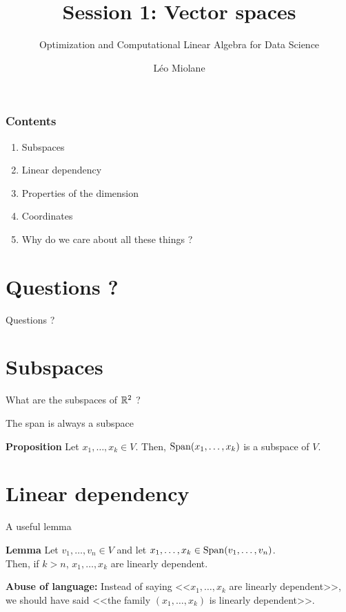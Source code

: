 \documentclass{beamer}
\title{Session 1: Vector spaces}
\subtitle{Optimization and Computational Linear Algebra for Data Science}
\author{Léo Miolane}
\date{}
\begin{document}
\setcounter{showProgressBar}{0}
\setcounter{showSlideNumbers}{0}

\frame{\titlepage}

\begin{frame}
	\frametitle{Contents}
	\begin{enumerate}
		\item Subspaces
		\item Linear dependency
		\item Properties of the dimension
		\item Coordinates
		\item Why do we care about all these things ? 
	\end{enumerate}
\end{frame}


\setcounter{framenumber}{0}
\setcounter{showSlideNumbers}{1}

\section{Questions ?}
\begin{frame}[t]{Questions ?}
	\pause
\end{frame}

\section{Subspaces}
\begin{frame}{What are the subspaces of $\mathbb{R}^2$ ?}
\end{frame}

\begin{frame}[t]{The span is always a subspace}
	\begin{block}{\bf Proposition}
		Let $x_1, \dots, x_k \in V$. Then, ${{\rm Span}}(x_1, \dots, x_k)$ is a subspace of $V$.
	\end{block}
\end{frame}

\section{Linear dependency}
\begin{frame}[t]{A useful lemma}
	\vspace{-0.4cm}
	\begin{block}{\bf Lemma}
		Let $v_1, \dots, v_n \in V$
		and let $x_1, \dots, x_k \in {{\rm Span}}(v_1, \dots, v_n)$.
		\\
		Then, if $k > n$,
		$x_1, \dots, x_k$ are linearly dependent.
	\end{block}
	\textbf{Abuse of language:} Instead of saying <<$x_1, \dots, x_k$ are linearly dependent>>, we should have said <<the family $(x_1, \dots, x_k)$ is linearly dependent>>.
\end{frame}
\end{document}
